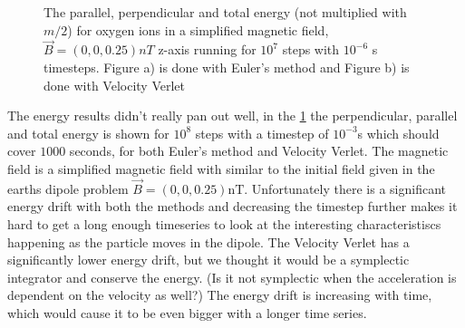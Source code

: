 \documentclass[x11names]{article}
\renewcommand{\va}{\vec}
\begin{document}
\begin{figure}
\begin{subfigure}{0.45\textwidth}
      \end{subfigure}
      \caption{The parallel, perpendicular and total energy (not multiplied with \(m/2\)) for oxygen ions in a simplified magnetic field, \(\va{B} = (0,0,0.25) nT \) z-axis running for \(10^7\) steps with \(10^{-6}\) s timesteps. Figure a) is done with Euler's method and Figure b) is done with Velocity Verlet}
      \label{fig:energy_simpleB}
    \end{figure}
    The energy results didn't really pan out well, in the \cref{fig:energy_simpleB} the perpendicular, parallel and total energy is shown for \(10^8\) steps with a timestep of \(10^{-3}\)s which should cover \(1000\) seconds, for both Euler's method and Velocity Verlet. The magnetic field is a simplified magnetic field with similar to the initial field given in the earths dipole problem \(\va{B} = (0,0,0.25) \si{\nano\tesla}\). Unfortunately there is a significant energy drift with both the methods and decreasing the timestep further makes it hard to get a long enough timeseries to look at the interesting characteristiscs happening as the particle moves in the dipole.  The Velocity Verlet has a significantly lower energy drift, but we thought it would be a symplectic integrator and conserve the energy. (Is it not symplectic when the acceleration is dependent on the velocity as well?) The energy drift is increasing with time, which would cause it to be even bigger with a longer time series.
    \\ \\

    
\end{document}
